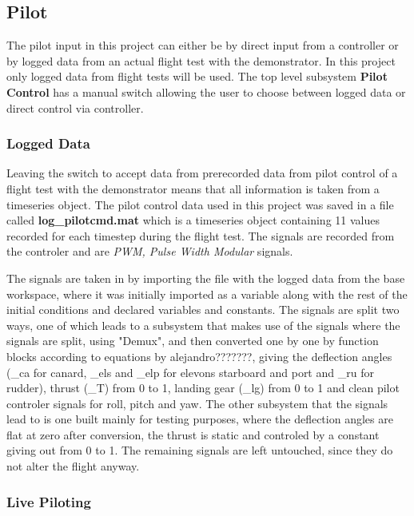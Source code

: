 \subsection{Pilot}

The pilot input in this project can either be by direct input from a controller or by logged data from an actual flight test with the demonstrator. In this project only logged data from flight tests will be used. The top level subsystem \textbf{Pilot Control} has a manual switch allowing the user to choose between logged data or direct control via controller.

\subsubsection{Logged Data}

Leaving the switch to accept data from prerecorded data from pilot control of a flight test with the demonstrator means that all information is taken from a timeseries object. The pilot control data used in this project was saved in a file called \textbf{log_pilotcmd.mat} which is a timeseries object containing 11 values recorded for each timestep during the flight test. The signals are recorded from the controler and are \textit{PWM, Pulse Width Modular} signals.

The signals are taken in by importing the file with the logged data from the base workspace, where it was initially imported as a variable along with the rest of the initial conditions and declared variables and constants. The signals are split two ways, one of which leads to a subsystem that makes use of the signals where the signals are split, using "Demux", and then converted one by one by function blocks according to equations by alejandro???????, giving the deflection angles (\delta_{ca} for canard, \delta_{els} and \delta_{elp} for elevons starboard and port and \delta_{ru} for rudder), thrust (\delta_{T}) from 0 to 1, landing gear (\delta_{lg}) from 0 to 1 and clean pilot controler signals for roll, pitch and yaw. The other subsystem that the signals lead to is one built mainly for testing purposes, where the deflection angles are flat at zero after conversion, the thrust is static and controled by a constant giving out from 0 to 1. The remaining signals are left untouched, since they do not alter the flight anyway.

\subsubsection{Live Piloting}
